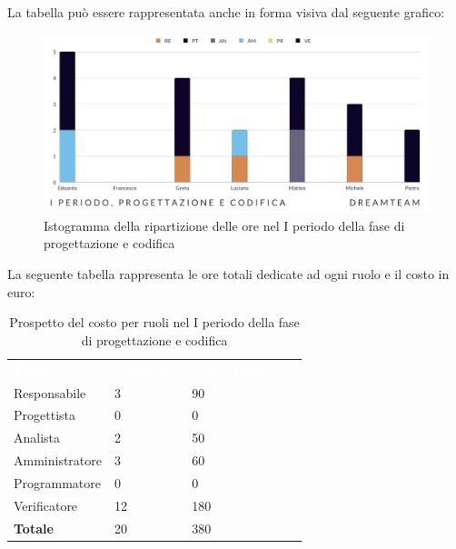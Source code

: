 La tabella può essere rappresentata anche in forma visiva dal seguente grafico:
\begin{figure}[H]
\centering
\includegraphics[scale=0.65]{Sezioni/SezioniPreventivo/grafici/Progettazione_codifica_I_periodo.png}
\caption{Istogramma della ripartizione delle ore nel I periodo della fase di progettazione e codifica}
\end{figure}

La seguente tabella rappresenta le ore totali dedicate ad ogni ruolo e il costo in euro:

\begin{table}[H]
\begin{center}
\renewcommand{\arraystretch}{1.5}
\begin{tabular}{ m{}<{\centering}  m{}<{\centering} m{}<{\centering}}
	\rowcolor{darkblue}
	\textcolor{white}{\textbf{Ruolo}}&\textcolor{white}{\textbf{Totale ore}}&\textcolor{white}{\textbf{Costo totale (\euro)}}\\ 

	Responsabile  & 3 & 90 \\	
	
	Progettista & 0 & 0 \\
	
	Analista & 2 & 50 \\

	Amministratore & 3 & 60 \\
	
	Programmatore & 0 & 0 \\
	
	Verificatore & 12 & 180 \\
	
	\textbf{Totale} & 20 & 380 \\
	
\end{tabular}
\caption{Prospetto del costo per ruoli nel I periodo della fase di progettazione e codifica}
\end{center}
\end{table}

